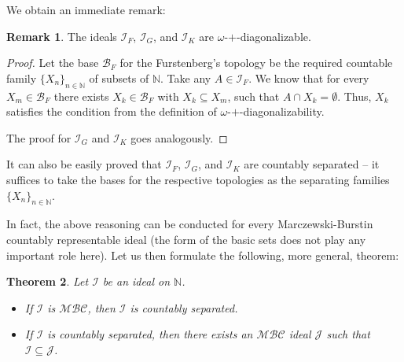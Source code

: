 \documentclass{amsart}
\newtheorem{thm}{Theorem}[section]
\theoremstyle{definition}
\newtheorem{remark}[thm]{Remark}
\newcommand{\N}{{\mathbb N}}
\newcommand{\I}{\mathcal I}
\newcommand{\J}{\mathcal J}
\newcommand{\B}{\mathcal{B}}
\newcommand{\MBC}{\mathcal{MBC}}
\begin{document}
We obtain an immediate remark:

\begin{remark}
The ideals $\I_F$, $\I_G$, and $\I_K$ are $\omega$-$+$-diagonalizable.
\end{remark}

\begin{proof}
Let the base $\B_F$ for the Furstenberg's topology be the required countable family $\{X_n\}_{n\in\N}$ of subsets of $\N$. Take any $A\in \I_F$. We know that for every $X_m \in \B_F$ there exists $X_k \in \B_F$ with $X_k \subseteq X_m$, such that $A\cap X_k = \emptyset$. Thus, $X_k$ satisfies the condition from the definition of $\omega$-$+$-diagonalizability.

The proof for $\I_G$ and $\I_K$ goes analogously.
\end{proof}

It can also be easily proved that $\I_F$, $\I_G$, and $\I_K$ are countably separated -- it suffices to take the bases for the respective topologies as the separating families $\{X_n\}_{n\in\N}$.

In fact, the above reasoning can be conducted for every Marczewski-Burstin countably representable ideal (the form of the basic sets does not play any important role here). Let us then formulate the following, more general, theorem:

\begin{thm}
Let $\I$ be an ideal on $\N$.
\begin{itemize}
\item[$(i)$] If $\I$ is $\MBC$, then $\I$ is countably separated.
\item[$(ii)$] If $\I$ is countably separated, then there exists an $\MBC$ ideal $\J$ such that $\I \subseteq \J$.
\end{itemize}
\end{thm}
\end{document}
